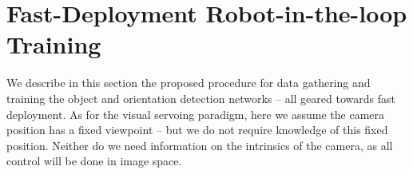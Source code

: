 \documentclass[conference]{ieeeconf}
\begin{document}
% 


\section{Fast-Deployment Robot-in-the-loop Training}%
\label{sec:pipeline}

We describe in this section the proposed procedure for data gathering and training the object and orientation detection networks -- all geared towards fast deployment.
As for the visual servoing paradigm, here we assume the camera position has a fixed viewpoint -- but we do not require knowledge of this fixed position.
Neither do we need information on the intrinsics of the camera, as all control will be done in image space.
\end{document}
